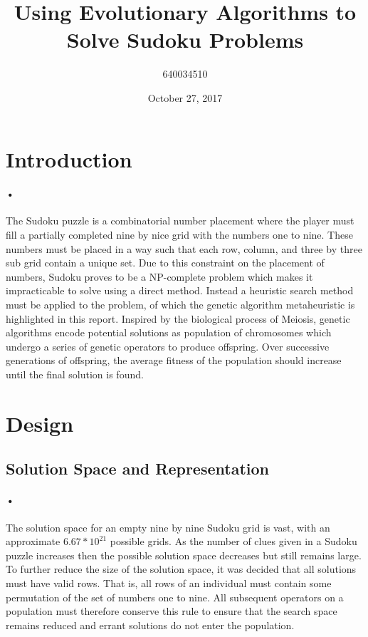 \documentclass[10pt]{article}
\begin{document}
\title{%
	Using Evolutionary Algorithms to Solve Sudoku Problems
	}
\author{640034510}
\date{October 27, 2017}
\maketitle

\section{Introduction}
\paragraph{•}
The Sudoku puzzle is a combinatorial number placement where the player must fill a partially completed nine by nice grid with the numbers one to nine. These numbers must be placed in a way such that each row, column, and three by three sub grid contain a unique set. Due to this constraint on the placement of numbers, Sudoku proves to be a NP-complete problem which makes it impracticable to solve using a direct method. Instead a heuristic search method must be applied to the problem, of which the genetic algorithm metaheuristic is highlighted in this report. Inspired by the biological process of Meiosis, genetic algorithms encode potential solutions as population of chromosomes which undergo a series of genetic operators to produce offspring. Over successive generations of offspring, the average fitness of the population should increase until the final solution is found. 
\section{Design}
\subsection{Solution Space and Representation}
\paragraph{•}
The solution space for an empty nine by nine Sudoku grid is vast, with an approximate $6.67*10^{21}$ possible grids. As the number of clues given in a Sudoku puzzle increases then the possible solution space decreases but still remains large. To further reduce the size of the solution space, it was decided that all solutions must have valid rows. That is, all rows of an individual must contain some permutation of the set of numbers one to nine. All subsequent operators on a population must therefore conserve this rule to ensure that the search space remains reduced and errant solutions do not enter the population.
\end{document}
